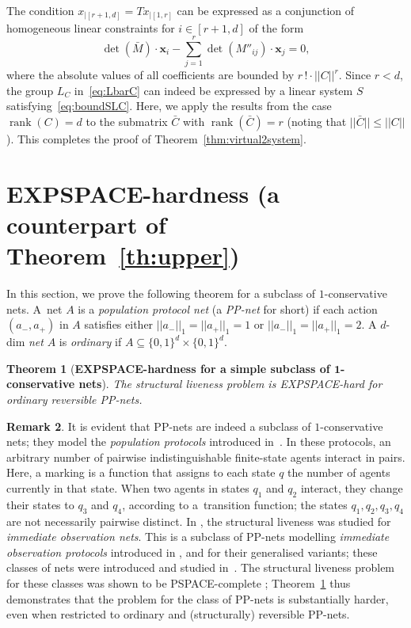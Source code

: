 \documentclass[11pt,a4paper]{amsart}
\newcommand{\bvar}[1]{\mathbf{#1}}
\newcommand{\nnorm}[1]{||#1||}
\newcommand{\PSPACE}{\textsc{PSPACE}\xspace}
\newcommand{\EXPSPACE}{EXPSPACE}
\newcommand{\normone}[1]{||#1||_1}
\newcommand{\myvec}[1]{#1}
\newcommand{\ppnets}{PP-nets\xspace}
\newcommand{\restr}[1]{_{|{#1}}}
\newcommand{\rank}[1]{\operatorname{rank}(#1)}
\let\origtextsc\textsc
\renewcommand{\textsc}[1]{\textnormal{\origtextsc{#1}}}
\theoremstyle{plain}
\newtheorem{thm}{Theorem}[section]
\theoremstyle{definition}
\newtheorem{rem}[thm]{Remark}
\theoremstyle{defC}
\theoremstyle{thmC}
\begin{document}
The condition $x\restr{[r+1,d]}=T x\restr{[1,r]}$ can be expressed
as a conjunction of homogeneous linear constraints for $i\in[r{+}1,d]$ of the form 
\[
	\det(\bar{M}) \cdot \bvar{x}_i - \sum_{j=1}^r \det(M''_{ij}) \cdot
    \bvar{x}_j = 0,
\]
where the absolute values of all coefficients are bounded by
$r\,! \cdot \nnorm{C}^r$. 
Since $r < d$, the group $L_{C}$ in~\eqref{eq:LbarC} can indeed
be expressed by a linear system $S$ satisfying~\eqref{eq:boundSLC}.
Here, we apply the results from the case $\rank{C} = d$ to the
submatrix $\bar{C}$ with $\rank{\bar{C}} = r$ (noting that
$\nnorm{\bar{C}} \leq \nnorm{C}$). This completes the proof of Theorem~\ref{thm:virtual2system}.
\section{\EXPSPACE-hardness 
(a counterpart of Theorem~\ref{th:upper})}\label{sec:hardness}
In this section, we prove the following theorem for a subclass
of $1$-conservative nets.
A~net $A$ is a
\emph{population protocol net} (a \emph{PP-net} for short) if each action
$(\myvec{a_-},\myvec{a_+})$ in $A$ satisfies either
$\normone{\myvec{a_-}} = \normone{\myvec{a_+}} = 1$ or
$\normone{\myvec{a_-}} = \normone{\myvec{a_+}} = 2$.
A $d$-dim \emph{net} $A$ is \emph{ordinary} if $A\subseteq \{0,1\}^d\times\{0,1\}^d$. 


\begin{thm}[\textbf{EXPSPACE-hardness for a simple subclass of
	$\bm{1}$-conservative nets}]\label{thm:lowerbound}
	The structural liveness problem is
    \EXPSPACE-hard for ordinary reversible PP-nets.
\end{thm}


\begin{rem}
It is evident that \ppnets are indeed a subclass of
$1$-conservative nets; they model the \emph{population
protocols} introduced
in~\cite{DBLP:journals/dc/AngluinADFP06}. In these protocols,
an arbitrary number of pairwise indistinguishable
finite-state agents interact in pairs. 
Here, a marking is a function that assigns to each state $q$ the
number of agents currently in that state.
When two
agents in states $q_1$ and $q_2$ interact, they
change their states to $q_3$ and $q_4$, 
according to a~transition function; the states $q_1,q_2,q_3,q_4$ are
not necessarily pairwise distinct. In \cite{DBLP:journals/fuin/JancarV22},
 the structural liveness was studied  for \emph{immediate observation
nets}. This is a subclass of
PP-nets modelling \emph{immediate observation protocols} introduced in
\cite{DBLP:journals/dc/AngluinAER07}, 
and for their generalised variants; these classes of nets
were introduced and studied
in~\cite{DBLP:conf/apn/EsparzaRW19,DBLP:conf/rp/RaskinW20,DBLP:conf/concur/RaskinWE20,DBLP:phd/dnb/Weil-Kennedy23}.
The structural liveness problem for these classes was shown to be 
\PSPACE-complete \cite{DBLP:journals/fuin/JancarV22};
Theorem~\ref{thm:lowerbound} thus demonstrates that the problem for the class
of PP-nets is substantially harder, even when restricted to ordinary
and (structurally) reversible PP-nets.
\end{rem}
\end{document}
